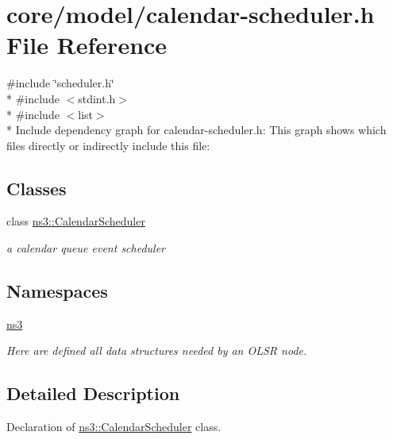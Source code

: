\hypertarget{calendar-scheduler_8h}{}\section{core/model/calendar-\/scheduler.h File Reference}
\label{calendar-scheduler_8h}
{\ttfamily \#include \char`\"{}scheduler.\+h\char`\"{}}\\*
{\ttfamily \#include $<$stdint.\+h$>$}\\*
{\ttfamily \#include $<$list$>$}\\*
Include dependency graph for calendar-\/scheduler.h\+:
This graph shows which files directly or indirectly include this file\+:
\subsection*{Classes}
\begin{DoxyCompactItemize}
\item 
class \hyperlink{classns3_1_1CalendarScheduler}{ns3\+::\+Calendar\+Scheduler}
\begin{DoxyCompactList}\small\item\em a calendar queue event scheduler \end{DoxyCompactList}\end{DoxyCompactItemize}
\subsection*{Namespaces}
\begin{DoxyCompactItemize}
\item 
 \hyperlink{namespacens3}{ns3}
\begin{DoxyCompactList}\small\item\em Here are defined all data structures needed by an O\+L\+SR node. \end{DoxyCompactList}\end{DoxyCompactItemize}


\subsection{Detailed Description}
Declaration of \hyperlink{classns3_1_1CalendarScheduler}{ns3\+::\+Calendar\+Scheduler} class. 